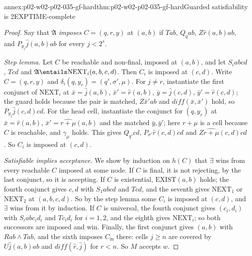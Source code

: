 \begin{annexitem}{annex:p02-w02-p02-035-gf-hard}{thm:p02-w02-p02-035-gf-hard}{Guarded satisfiability is 2EXPTIME-complete}
\begin{proof}
Say that \(\mathfrak A\) \emph{imposes} \(C=(q,r,y)\) at \((a,b)\) if
\(Tab\), \(Q_qab\), \(Z\hat r(a,b)ab\), and \(P_{y_j}\hat j(a,b)ab\) for every
\(j<2^{s}\).

\emph{Step lemma.}  Let \(C\) be reachable and non-final, imposed at
\((a,b)\), and let \(S_iabcd\), \(Tcd\) and
\(\mathfrak A\entails\mathrm{NEXT}_i(a,b,c,d)\).  Then \(C_i\) is imposed at
\((c,d)\).  Write \(C=(q,r,y)\) and \(\delta_i(q,y_r)=(q',\sigma',\mu)\).  For
\(j\neq r\), instantiate the first conjunct of \(\mathrm{NEXT}_i\) at
\(\bar x=\hat j(a,b)\), \(\bar x'=\hat r(a,b)\), \(\bar y=\hat j(c,d)\),
\(\bar y'=\hat r(c,d)\); the guard holds because the pair is matched,
\(Z\bar x'ab\) and \(\mathit{diff}(\bar x,\bar x')\) hold, so
\(P_{y_j}\hat j(c,d)cd\).  For the head cell, instantiate the conjunct for
\((q,y_r)\) at \(\bar x=\hat r(a,b)\), \(\bar x'=\widehat{r+\mu}(a,b)\) and the
matched \(\bar y,\bar y'\); here \(r+\mu\) is a cell because \(C\) is
reachable, and \(\gamma_\mu\) holds.  This gives \(Q_{q'}cd\),
\(P_{\sigma'}\hat r(c,d)cd\) and \(Z\widehat{r+\mu}(c,d)cd\).  So \(C_i\) is
imposed at \((c,d)\).

\emph{Satisfiable implies acceptance.}  We show by induction on \(h(C)\)
that \(\exists\) wins from every reachable \(C\) imposed at some node.  If
\(C\) is final, it is not rejecting, by the last conjunct, so it is
accepting.  If \(C\) is existential, \(\mathrm{EXIST}(a,b)\) holds; the fourth
conjunct gives \(c,d\) with \(S_1abcd\) and \(Tcd\), and the seventh gives
\(\mathrm{NEXT}_1\) or \(\mathrm{NEXT}_2\) at \((a,b,c,d)\).  So by the step
lemma some \(C_i\) is imposed at \((c,d)\), and \(\exists\) wins from it by
induction.  If \(C\) is universal, the fourth conjunct gives
\((c_i,d_i)\) with \(S_iabc_id_i\) and \(Tc_id_i\) for \(i=1,2\), and the
eighth gives \(\mathrm{NEXT}_i\); so both successors are imposed and win.
Finally, the first conjunct gives \((a,b)\) with \(Rab\land Tab\), and the
sixth imposes \(C_{\mathrm{in}}\) there: cells \(j\geq n\) are covered by
\(U\hat j(a,b)ab\) and \(\mathit{diff}(\hat r,\hat j)\) for \(r<n\).  So
\(M\) accepts \(w\).


\end{proof}
\end{annexitem}
